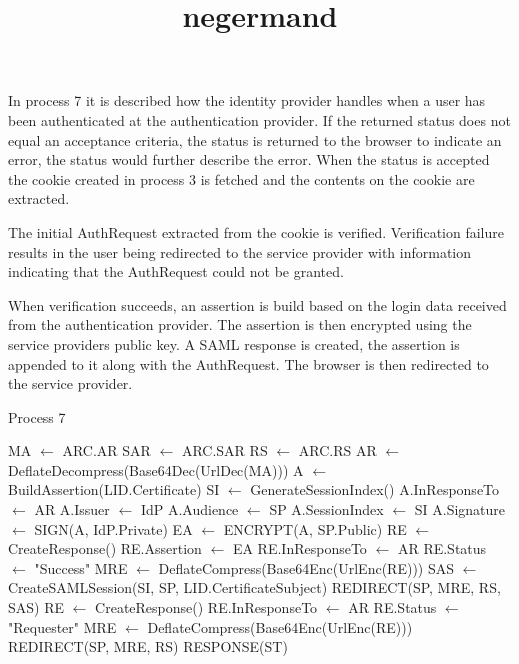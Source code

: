 \documentclass[twosided]{report}
\begin{document}
In process 7 it is described how the identity provider handles when a user has been authenticated at the authentication provider. If the returned status does not equal an acceptance criteria, the status is returned to the browser to indicate an error, the status would further describe the error. When the status is accepted the cookie created in process 3 is fetched and the contents on the cookie are extracted.
\par
The initial AuthRequest extracted from the cookie is verified. Verification failure results in the user being redirected to the service provider with information indicating that the AuthRequest could not be granted.
\par
When verification succeeds, an assertion is build based on the login data received from the authentication provider. The assertion is then encrypted using the service providers public key. A SAML response is created, the assertion is appended to it along with the AuthRequest. The browser is then redirected to the service provider.
\begin{algorithm}[H]
	\title{negermand}
	\caption{Process 7}
	\begin{algorithmic}
			\STATE MA $\leftarrow$ ARC.AR
			\STATE SAR $\leftarrow$ ARC.SAR
			\STATE RS $\leftarrow$ ARC.RS
			\STATE AR $\leftarrow$ DeflateDecompress(Base64Dec(UrlDec(MA)))
				\STATE A $\leftarrow$ BuildAssertion(LID.Certificate)
				\STATE SI $\leftarrow$ GenerateSessionIndex()
				\STATE A.InResponseTo $\leftarrow$ AR
				\STATE A.Issuer $\leftarrow$ IdP
				\STATE A.Audience $\leftarrow$ SP
				\STATE A.SessionIndex $\leftarrow$ SI
				\STATE A.Signature $\leftarrow$ SIGN(A, IdP.Private)
				\STATE EA $\leftarrow$ ENCRYPT(A, SP.Public)
				\STATE RE $\leftarrow$ CreateResponse()
				\STATE RE.Assertion $\leftarrow$ EA
				\STATE RE.InResponseTo $\leftarrow$ AR
				\STATE RE.Status $\leftarrow$ "Success"
				\STATE MRE $\leftarrow$ DeflateCompress(Base64Enc(UrlEnc(RE)))
				\STATE SAS $\leftarrow$ CreateSAMLSession(SI, SP, LID.CertificateSubject)
				\RETURN REDIRECT(SP, MRE, RS, SAS)
			\ELSE
				\STATE RE $\leftarrow$ CreateResponse()
				\STATE RE.InResponseTo $\leftarrow$ AR
				\STATE RE.Status $\leftarrow$ "Requester"
				\STATE MRE $\leftarrow$ DeflateCompress(Base64Enc(UrlEnc(RE)))
				\RETURN REDIRECT(SP, MRE, RS)
			\ENDIF	
		\ELSE
			\RETURN RESPONSE(ST)
		\ENDIF
	\end{algorithmic}
\end{algorithm}
\end{document}
